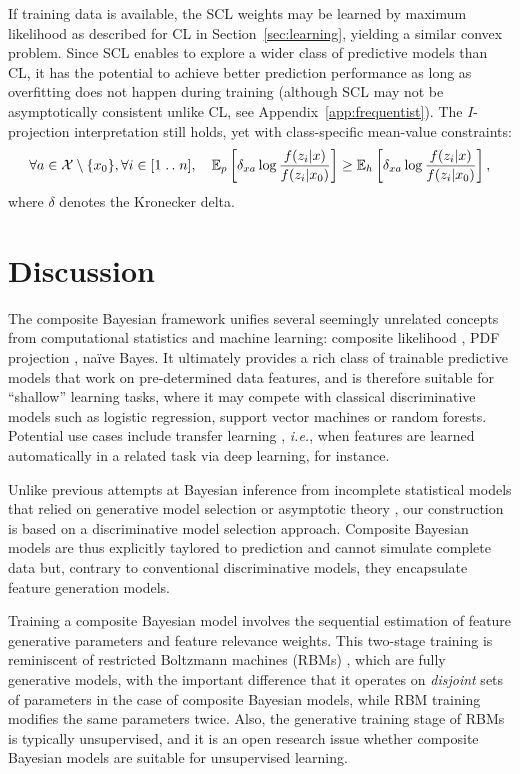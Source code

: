 \documentclass[english]{scrartcl}
\newcommand{\E}{\mathbb{E}}
\newcommand{\isep}{\mathrel{{.}\,{.}}\nobreak}
\begin{document}
If training data is available, the SCL weights may be learned by maximum likelihood as described for CL in Section~\ref{sec:learning}, yielding a similar convex problem. Since SCL enables to explore a wider class of predictive models than CL, it has the potential to achieve better prediction performance as long as overfitting does not happen during training (although SCL may not be asymptotically consistent unlike CL, see Appendix~\ref{app:frequentist}). The $I$-projection interpretation still holds, yet with class-specific mean-value constraints:
$$
\forall a\in{\cal X}\setminus\{x_0\}, \forall i\in [1\isep n],
\quad
\E_p\left[\delta_{xa}\log \frac{f(z_i|x)}{f(z_i|x_0)}\right]
\geq \E_h\left[\delta_{xa}\log \frac{f(z_i|x)}{f(z_i|x_0)}\right],
$$
where $\delta$ denotes the Kronecker delta. 



\section{Discussion}
\label{sec:discussion}

The composite Bayesian framework unifies several seemingly unrelated concepts from computational statistics and machine learning: composite likelihood \cite{Varin-11}, PDF projection \cite{Baggenstoss-03}, na\"ive Bayes. It ultimately provides a rich class of trainable predictive models that work on pre-determined data features, and is therefore suitable for ``shallow'' learning tasks, where it may compete with classical discriminative models such as logistic regression, support vector machines or random forests. Potential use cases include transfer learning \cite{Goodfellow-16}, {\em i.e.}, when features are learned automatically in a related task via deep learning, for instance.

Unlike previous attempts at Bayesian inference from incomplete statistical models that relied on generative model selection \cite{Yuan-99b,Wang-14} or asymptotic theory \cite{Pauli-11,Ribatet-12}, our construction is based on a discriminative model selection approach. Composite Bayesian models are thus explicitly taylored to prediction and cannot simulate complete data but, contrary to conventional discriminative models, they encapsulate feature generation models.

Training a composite Bayesian model involves the sequential estimation of feature generative parameters and feature relevance weights. This two-stage training is reminiscent of restricted Boltzmann machines (RBMs) \cite{Hinton-06,Fischer-14}, which are fully generative models, with the important difference that it operates on {\em disjoint} sets of parameters in the case of composite Bayesian models, while RBM training modifies the same parameters twice. Also, the generative training stage of RBMs is typically unsupervised, and it is an open research issue whether composite Bayesian models are suitable for unsupervised learning.
\end{document}
